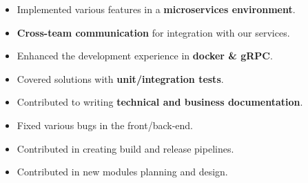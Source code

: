 \documentclass[10pt,a4paper,ragged2e]{altacv}
\begin{document}

\personalinfo{%
	
}

\begin{fullwidth}
	\makecvheader
\end{fullwidth}




\medskip
{}

\begin{itemize}
	\item Implemented various features in a \textbf{microservices environment}.
	\item \textbf{Cross-team communication} for integration with our services.
	\item Enhanced the development experience in \textbf{docker \& gRPC}.
	\item Covered solutions with \textbf{unit/integration tests}.
	\item Contributed to writing \textbf{technical and business documentation}.
	\item Fixed various bugs in the front/back-end.
	\item Contributed in creating build and release pipelines.
	\item Contributed in new modules planning and design.
\end{itemize}

\medskip
{}   

    

 
\end{document}
